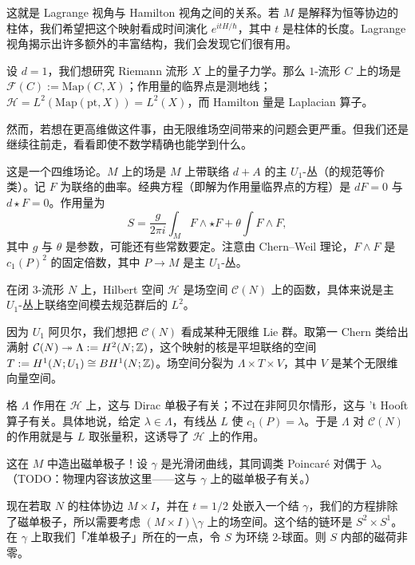这就是 Lagrange 视角与 Hamilton 视角之间的关系。若 $M$ 是解释为恒等协边的柱体，我们希望把这个映射看成时间演化 $e^{itH/\hbar}$，其中 $t$ 是柱体的长度。Lagrange 视角揭示出许多额外的丰富结构，我们会发现它们很有用。

\begin{example}
  设 $d = 1$，我们想研究 Riemann 流形 $X$ 上的量子力学。那么 $1$-流形 $C$ 上的场是 $\mathcal{F}(C) := \mathrm{Map}(C,X)$；作用量的临界点是测地线；$\mathcal{H} = L^2(\mathrm{Map}(\mathrm{pt},X)) = L^2(X)$，而 Hamilton 量是 Laplacian 算子。
\end{example}

然而，若想在更高维做这件事，由无限维场空间带来的问题会更严重。但我们还是继续往前走，看看即使不数学精确也能学到什么。

\begin{example}[量子 Maxwell 理论]
  这是一个四维场论。$M$ 上的场是 $M$ 上带联络 $d + A$ 的主 $U_1$-丛（的规范等价类）。记 $F$ 为联络的曲率。经典方程（即解为作用量临界点的方程）是 $dF = 0$ 与 $d\star F = 0$。作用量为
  \[
    S = \frac{g}{2\pi i}\int_M F\wedge\star F + \theta\int F\wedge F,
  \]
  其中 $g$ 与 $\theta$ 是参数，可能还有些常数要定。注意由 Chern--Weil 理论，$F\wedge F$ 是 $c_1(P)^2$ 的固定倍数，其中 $P\to M$ 是主 $U_1$-丛。

  在闭 $3$-流形 $N$ 上，Hilbert 空间 $\mathcal{H}$ 是场空间 $\mathcal{C}(N)$ 上的函数，具体来说是主 $U_1$-丛上联络空间模去规范群后的 $L^2$。

  因为 $U_1$ 阿贝尔，我们想把 $\mathcal{C}(N)$ 看成某种无限维 Lie 群。取第一 Chern 类给出满射 $\mathcal{C}(N)\twoheadrightarrow \Lambda := H^2(N;\mathbb{Z})$，这个映射的核是平坦联络的空间 $T := H^1(N;U_1)\cong BH^1(N;\mathbb{Z})$。场空间分裂为 $\Lambda\times T\times V$，其中 $V$ 是某个无限维向量空间。

  格 $\Lambda$ 作用在 $\mathcal{H}$ 上，这与 Dirac 单极子有关；不过在非阿贝尔情形，这与 't Hooft 算子有关。具体地说，给定 $\lambda\in\Lambda$，有线丛 $L$ 使 $c_1(P) = \lambda$。于是 $\Lambda$ 对 $\mathcal{C}(N)$ 的作用就是与 $L$ 取张量积，这诱导了 $\mathcal{H}$ 上的作用。

  这在 $M$ 中造出磁单极子！设 $\gamma$ 是光滑闭曲线，其同调类 Poincaré 对偶于 $\lambda$。（TODO：物理内容该放这里——这与 $\gamma$ 上的磁单极子有关。）

  现在若取 $N$ 的柱体协边 $M\times I$，并在 $t = 1/2$ 处嵌入一个结 $\gamma$，我们的方程排除了磁单极子，所以需要考虑 $(M\times I)\setminus\gamma$ 上的场空间。这个结的链环是 $S^2\times S^1$。在 $\gamma$ 上取我们「准单极子」所在的一点，令 $S$ 为环绕 $2$-球面。则 $S$ 内部的磁荷非零。


\end{example}
